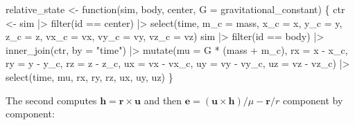 \documentclass[
  10.5pt,
  letterpaper,
]{scrbook}
\newenvironment{Shaded}{\begin{snugshade}}{\end{snugshade}}
\newcommand{\AttributeTok}[1]{\textcolor[rgb]{0.00,0.00,0.00}{#1}}
\newcommand{\ControlFlowTok}[1]{\textcolor[rgb]{0.00,0.00,0.00}{#1}}
\newcommand{\FunctionTok}[1]{\textcolor[rgb]{0.00,0.00,0.00}{#1}}
\newcommand{\NormalTok}[1]{\textcolor[rgb]{0.00,0.00,0.00}{#1}}
\newcommand{\OtherTok}[1]{\textcolor[rgb]{0.00,0.00,0.00}{#1}}
\newcommand{\SpecialCharTok}[1]{\textcolor[rgb]{0.00,0.00,0.00}{#1}}
\newcommand{\StringTok}[1]{\textcolor[rgb]{0.00,0.00,0.00}{#1}}
\theoremstyle{definition}
\theoremstyle{plain}
\theoremstyle{remark}
\begin{document}
\begin{Shaded}
\begin{Highlighting}[]
\NormalTok{relative\_state }\OtherTok{\textless{}{-}} \ControlFlowTok{function}\NormalTok{(sim, body, center, }\AttributeTok{G =}\NormalTok{ gravitational\_constant) \{}
\NormalTok{  ctr }\OtherTok{\textless{}{-}}\NormalTok{ sim }\SpecialCharTok{|\textgreater{}}
    \FunctionTok{filter}\NormalTok{(id }\SpecialCharTok{==}\NormalTok{ center) }\SpecialCharTok{|\textgreater{}}
    \FunctionTok{select}\NormalTok{(time, }\AttributeTok{m\_c =}\NormalTok{ mass, }\AttributeTok{x\_c =}\NormalTok{ x, }\AttributeTok{y\_c =}\NormalTok{ y, }\AttributeTok{z\_c =}\NormalTok{ z,}
           \AttributeTok{vx\_c =}\NormalTok{ vx, }\AttributeTok{vy\_c =}\NormalTok{ vy, }\AttributeTok{vz\_c =}\NormalTok{ vz)}
\NormalTok{  sim }\SpecialCharTok{|\textgreater{}}
    \FunctionTok{filter}\NormalTok{(id }\SpecialCharTok{==}\NormalTok{ body) }\SpecialCharTok{|\textgreater{}}
    \FunctionTok{inner\_join}\NormalTok{(ctr, }\AttributeTok{by =} \StringTok{"time"}\NormalTok{) }\SpecialCharTok{|\textgreater{}}
    \FunctionTok{mutate}\NormalTok{(}\AttributeTok{mu =}\NormalTok{ G }\SpecialCharTok{*}\NormalTok{ (mass }\SpecialCharTok{+}\NormalTok{ m\_c),}
           \AttributeTok{rx =}\NormalTok{ x }\SpecialCharTok{{-}}\NormalTok{ x\_c,   }\AttributeTok{ry =}\NormalTok{ y }\SpecialCharTok{{-}}\NormalTok{ y\_c,   }\AttributeTok{rz =}\NormalTok{ z }\SpecialCharTok{{-}}\NormalTok{ z\_c,}
           \AttributeTok{ux =}\NormalTok{ vx }\SpecialCharTok{{-}}\NormalTok{ vx\_c, }\AttributeTok{uy =}\NormalTok{ vy }\SpecialCharTok{{-}}\NormalTok{ vy\_c, }\AttributeTok{uz =}\NormalTok{ vz }\SpecialCharTok{{-}}\NormalTok{ vz\_c) }\SpecialCharTok{|\textgreater{}}
    \FunctionTok{select}\NormalTok{(time, mu, rx, ry, rz, ux, uy, uz)}
\NormalTok{\}}
\end{Highlighting}
\end{Shaded}

The second computes \(\mathbf{h} = \mathbf{r}\times\mathbf{u}\) and then
\(\mathbf{e} = (\mathbf{u}\times\mathbf{h})/\mu - \mathbf{r}/r\)
component by component:
\end{document}
